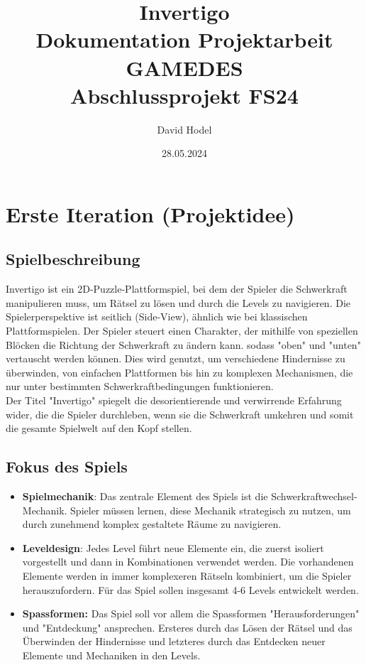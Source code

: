 \documentclass{article}
\title{%
Invertigo \\
\large Dokumentation Projektarbeit GAMEDES \\
  Abschlussprojekt FS24}
\author{David Hodel}
\date{28.05.2024}
\begin{document}
\maketitle
\newpage

\tableofcontents
\newpage

\section{Erste Iteration (Projektidee)}

\subsection{Spielbeschreibung}
Invertigo ist ein 2D-Puzzle-Plattformspiel, bei dem der Spieler die Schwerkraft manipulieren muss,
um Rätsel zu lösen und durch die Levels zu navigieren.
Die Spielerperspektive ist seitlich (Side-View), ähnlich wie bei klassischen Plattformspielen.
Der Spieler steuert einen Charakter, der mithilfe von speziellen Blöcken die Richtung der Schwerkraft zu ändern kann.
sodass "oben" und "unten" vertauscht werden können.
Dies wird genutzt, um verschiedene Hindernisse zu überwinden, von einfachen Plattformen bis hin zu komplexen Mechanismen,
die nur unter bestimmten Schwerkraftbedingungen funktionieren.
\\
Der Titel "Invertigo" spiegelt die desorientierende und verwirrende Erfahrung wider, die die Spieler durchleben,
wenn sie die Schwerkraft umkehren und somit die gesamte Spielwelt auf den Kopf stellen.

\subsection{Fokus des Spiels}

\begin{itemize}
    \item \textbf{Spielmechanik}: Das zentrale Element des Spiels ist die Schwerkraftwechsel-Mechanik.
    Spieler müssen lernen, diese Mechanik strategisch zu nutzen, um durch zunehmend komplex gestaltete Räume zu navigieren.
    \item \textbf{Leveldesign}: Jedes Level führt neue Elemente ein, die zuerst isoliert vorgestellt und dann in Kombinationen verwendet werden.
    Die vorhandenen Elemente werden in immer komplexeren Rätseln kombiniert, um die Spieler herauszufordern.
    Für das Spiel sollen insgesamt 4-6 Levels entwickelt werden.
    \item \textbf{Spassformen:} Das Spiel soll vor allem die Spassformen "Herausforderungen" und "Entdeckung" ansprechen. Ersteres durch das Lösen
    der Rätsel und das Überwinden der Hindernisse und letzteres durch das Entdecken neuer Elemente und Mechaniken in den Levels.
\end{itemize}
\end{document}
